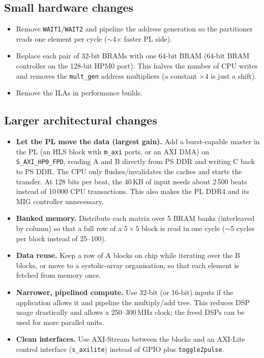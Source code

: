 \documentclass[11pt,a4paper]{article}
\newcommand{\code}[1]{\texttt{#1}}
\begin{document}
\subsection{Small hardware changes}
\begin{itemize}
  \item Remove \code{WAIT1}/\code{WAIT2} and pipeline the address generation so the partitioner reads one element per cycle ($\sim$4$\times$ faster PL side).
  \item Replace each pair of 32-bit BRAMs with one 64-bit BRAM (64-bit BRAM controller on the 128-bit HPM0 port). This halves the number of CPU writes and removes the \code{mult\_gen} address multipliers (a constant $\times4$ is just a shift).
  \item Remove the ILAs in performance builds.
\end{itemize}

\subsection{Larger architectural changes}
\begin{itemize}
  \item \textbf{Let the PL move the data (largest gain).} Add a burst-capable master in the PL (an HLS block with \code{m\_axi} ports, or an AXI DMA) on \code{S\_AXI\_HP0\_FPD}, reading A and B directly from PS DDR and writing C back to PS DDR. The CPU only flushes/invalidates the caches and starts the transfer. At 128 bits per beat, the 40\,KB of input needs about 2\,500 beats instead of 10\,000 CPU transactions. This also makes the PL DDR4 and its MIG controller unnecessary.
  \item \textbf{Banked memory.} Distribute each matrix over 5 BRAM banks (interleaved by column) so that a full row of a $5\times5$ block is read in one cycle ($\sim$5 cycles per block instead of 25--100).
  \item \textbf{Data reuse.} Keep a row of A blocks on chip while iterating over the B blocks, or move to a systolic-array organisation, so that each element is fetched from memory once.
  \item \textbf{Narrower, pipelined compute.} Use 32-bit (or 16-bit) inputs if the application allows it and pipeline the multiply/add tree. This reduces DSP usage drastically and allows a 250--300\,MHz clock; the freed DSPs can be used for more parallel units.
  \item \textbf{Clean interfaces.} Use AXI-Stream between the blocks and an AXI-Lite control interface (\code{s\_axilite}) instead of GPIO plus \code{toggle2pulse}.
\end{itemize}
\end{document}
